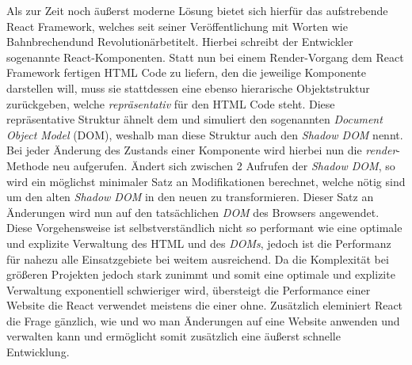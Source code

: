 Als zur Zeit noch äußerst moderne Lösung bietet sich hierfür das aufstrebende React Framework, welches seit seiner Veröffentlichung mit Worten wie \glqq Bahnbrechend\grqq und \glqq Revolutionär\grqq betitelt.
Hierbei schreibt der Entwickler sogenannte React-Komponenten.
Statt nun bei einem Render-Vorgang dem React Framework fertigen HTML Code zu liefern, den die jeweilige Komponente darstellen will, muss sie stattdessen eine ebenso hierarische Objektstruktur zurückgeben, welche \textit{repräsentativ} für den HTML Code steht.
Diese repräsentative Struktur ähnelt dem und simuliert den sogenannten \textit{Document Object Model} (DOM), weshalb man diese Struktur auch den \textit{Shadow DOM} nennt.
Bei jeder Änderung des Zustands einer Komponente wird hierbei nun die \textit{render}-Methode neu aufgerufen.
Ändert sich zwischen 2 Aufrufen der \textit{Shadow DOM}, so wird ein möglichst minimaler Satz an Modifikationen berechnet, welche nötig sind um den alten \textit{Shadow DOM} in den neuen zu transformieren.
Dieser Satz an Änderungen wird nun auf den tatsächlichen \textit{DOM} des Browsers angewendet. \\

Diese Vorgehensweise ist selbstverständlich nicht so performant wie eine optimale und explizite Verwaltung des HTML und des \textit{DOMs}, jedoch ist die Performanz für nahezu alle Einsatzgebiete bei weitem ausreichend.
Da die Komplexität bei größeren Projekten jedoch stark zunimmt und somit eine optimale und explizite Verwaltung exponentiell schwieriger wird, übersteigt die Performance einer Website die React verwendet meistens die einer ohne.
Zusätzlich eleminiert React die Frage gänzlich, wie und wo man Änderungen auf eine Website anwenden und verwalten kann und ermöglicht somit zusätzlich eine äußerst schnelle Entwicklung.


